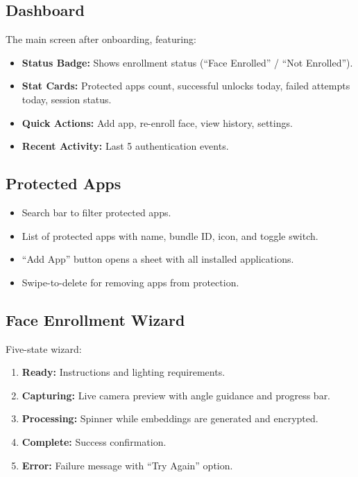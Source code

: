 \documentclass[12pt,a4paper]{report}
\begin{document}
\subsection{Dashboard}
The main screen after onboarding, featuring:
\begin{itemize}[noitemsep]
    \item \textbf{Status Badge:} Shows enrollment status (``Face Enrolled'' / ``Not Enrolled'').
    \item \textbf{Stat Cards:} Protected apps count, successful unlocks today, failed attempts today, session status.
    \item \textbf{Quick Actions:} Add app, re-enroll face, view history, settings.
    \item \textbf{Recent Activity:} Last 5 authentication events.
\end{itemize}

\subsection{Protected Apps}
\begin{itemize}[noitemsep]
    \item Search bar to filter protected apps.
    \item List of protected apps with name, bundle ID, icon, and toggle switch.
    \item ``Add App'' button opens a sheet with all installed applications.
    \item Swipe-to-delete for removing apps from protection.
\end{itemize}

\subsection{Face Enrollment Wizard}
Five-state wizard:
\begin{enumerate}[noitemsep]
    \item \textbf{Ready:} Instructions and lighting requirements.
    \item \textbf{Capturing:} Live camera preview with angle guidance and progress bar.
    \item \textbf{Processing:} Spinner while embeddings are generated and encrypted.
    \item \textbf{Complete:} Success confirmation.
    \item \textbf{Error:} Failure message with ``Try Again'' option.
\end{enumerate}
\end{document}
